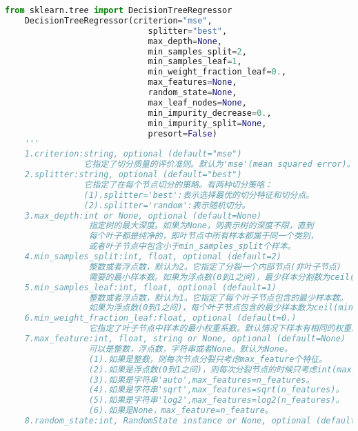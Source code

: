 \documentclass[18pt,a4paper,oneside,UTF8]{ctexart}
\begin{document}
\begin{lstlisting}[language=python]
    from sklearn.tree import DecisionTreeRegressor
    DecisionTreeRegressor(criterion="mse",
                             splitter="best",
                             max_depth=None,
                             min_samples_split=2,
                             min_samples_leaf=1,
                             min_weight_fraction_leaf=0.,
                             max_features=None,
                             random_state=None,
                             max_leaf_nodes=None,
                             min_impurity_decrease=0.,
                             min_impurity_split=None,
                             presort=False)
    '''
    1.criterion:string, optional (default="mse")
                它指定了切分质量的评价准则。默认为'mse'(mean squared error)。
    2.splitter:string, optional (default="best")
                它指定了在每个节点切分的策略。有两种切分策咯：
                (1).splitter='best':表示选择最优的切分特征和切分点。
                (2).splitter='random':表示随机切分。
    3.max_depth:int or None, optional (default=None)
                 指定树的最大深度。如果为None，则表示树的深度不限，直到
                 每个叶子都是纯净的，即叶节点中所有样本都属于同一个类别，
                 或者叶子节点中包含小于min_samples_split个样本。
    4.min_samples_split:int, float, optional (default=2)
                 整数或者浮点数，默认为2。它指定了分裂一个内部节点(非叶子节点)
                 需要的最小样本数。如果为浮点数(0到1之间)，最少样本分割数为ceil(min_samples_split * n_samples)
    5.min_samples_leaf:int, float, optional (default=1)
                 整数或者浮点数，默认为1。它指定了每个叶子节点包含的最少样本数。
                 如果为浮点数(0到1之间)，每个叶子节点包含的最少样本数为ceil(min_samples_leaf * n_samples)
    6.min_weight_fraction_leaf:float, optional (default=0.)
                 它指定了叶子节点中样本的最小权重系数。默认情况下样本有相同的权重。
    7.max_feature:int, float, string or None, optional (default=None)
                 可以是整数，浮点数，字符串或者None。默认为None。
                 (1).如果是整数，则每次节点分裂只考虑max_feature个特征。
                 (2).如果是浮点数(0到1之间)，则每次分裂节点的时候只考虑int(max_features * n_features)个特征。
                 (3).如果是字符串'auto',max_features=n_features。
                 (4).如果是字符串'sqrt',max_features=sqrt(n_features)。
                 (5).如果是字符串'log2',max_features=log2(n_features)。
                 (6).如果是None，max_feature=n_feature。
    8.random_state:int, RandomState instance or None, optional (default=None)

\end{lstlisting}
\end{document}
